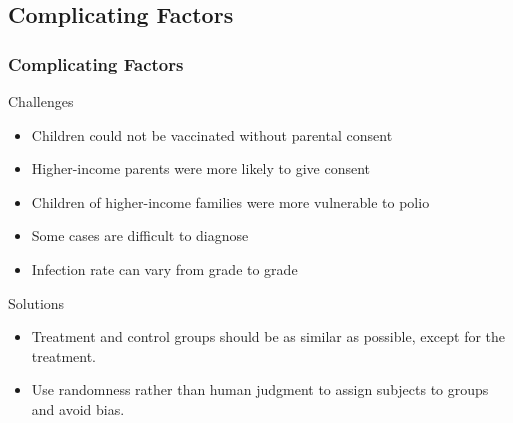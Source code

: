 \documentclass[t,xcolor=pst,dvips]{beamer}
\begin{document}
\subsection{Complicating Factors}
\begin{frame}[t]\frametitle{Complicating Factors}
{\small
Challenges
\begin{itemize}
\item Children could not be vaccinated without parental consent
\item Higher-income parents were more likely to give consent
\item Children of higher-income families were more vulnerable to polio
\item Some cases are difficult to diagnose
\item Infection rate can vary from grade to grade
\end{itemize}
\medskip

Solutions
\begin{itemize}
\item Treatment and control groups should be as similar as possible, except for the treatment.
\item Use randomness rather than human judgment to assign subjects to groups and avoid bias.
\end{itemize}}
\end{frame}
 
\end{document}
